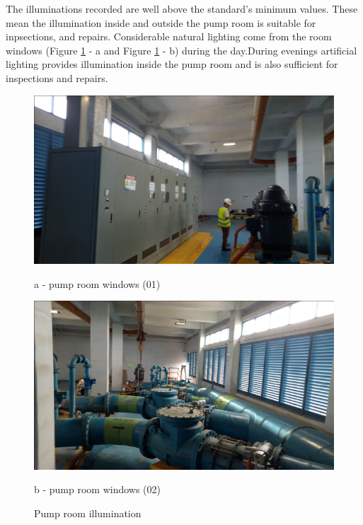

The illuminations recorded are well above the standard's minimum values. These mean the illumination inside and outside the pump room is suitable for inpsections, and repairs. Considerable natural lighting come from the room windows (Figure \ref{pump_room_illumination} - a and Figure \ref{pump_room_illumination} - b) during the day.During evenings artificial lighting provides illumination inside the pump room and is also sufficient for inspections and repairs.

\begin{figure}
	\begin{minipage}[b]{0.4\linewidth}
		\centering
		\includegraphics[width=\textwidth]{figures/fig_ch047_wem_illumination1}
		\caption*{a - pump room windows (01)}
		\label{ch047_wem_illumination1}
	\end{minipage}
	\hspace{0.05cm}
	\begin{minipage}[b]{0.4\linewidth}
		\centering
		\includegraphics[width=\textwidth]{figures/fig_ch047_wem_illumination2}
		\caption*{b - pump room windows (02)}
		\label{ch047_wem_illumination2}
	\end{minipage}
\caption{Pump room illumination}
\label{pump_room_illumination}
\end{figure}

